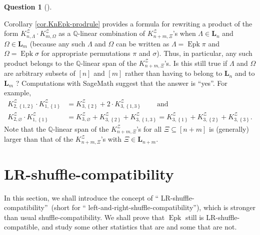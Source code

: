 \documentclass[numbers=enddot,12pt,final,onecolumn,notitlepage]{scrartcl}%
\theoremstyle{definition}
\newtheorem{quest}[theo]{Question}
\newenvironment{question}[1][]
{\begin{quest}[#1]\begin{leftbar}}
{\end{leftbar}\end{quest}}
\newenvironment{question}[1][Question]{\noindent\textbf{#1.} }{\ \rule{0.5em}{0.5em}}
\begin{document}
\begin{question}
Corollary \ref{cor.KnEpk-prodrule} provides a formula for rewriting a product
of the form $K_{n,\Lambda}^{\mathcal{Z}}\cdot K_{m,\Omega}^{\mathcal{Z}}$ as a
$\mathbb{Q}$-linear combination of $K_{n+m,\Xi}^{\mathcal{Z}}$'s when
$\Lambda\in\mathbf{L}_{n}$ and $\Omega\in\mathbf{L}_{m}$ (because any such
$\Lambda$ and $\Omega$ can be written as $\Lambda=\operatorname{Epk}\pi$ and
$\Omega=\operatorname{Epk}\sigma$ for appropriate permutations $\pi$ and
$\sigma$). Thus, in particular, any such product belongs to the $\mathbb{Q}%
$-linear span of the $K_{n+m,\Xi}^{\mathcal{Z}}$'s. Is this still true if
$\Lambda$ and $\Omega$ are arbitrary subsets of $\left[  n\right]  $ and
$\left[  m\right]  $ rather than having to belong to $\mathbf{L}_{n}$ and to
$\mathbf{L}_{m}$ ? Computations with SageMath suggest that the answer is
\textquotedblleft yes\textquotedblright. For example,%
\begin{align*}
K_{2,\left\{  1,2\right\}  }^{\mathcal{Z}}\cdot K_{1,\left\{  1\right\}
}^{\mathcal{Z}}  & =K_{3,\left\{  2\right\}  }^{\mathcal{Z}}+2\cdot
K_{3,\left\{  1,3\right\}  }^{\mathcal{Z}}\ \ \ \ \ \ \ \ \ \ \text{and}\\
K_{2,\varnothing}^{\mathcal{Z}}\cdot K_{1,\left\{  1\right\}  }^{\mathcal{Z}}
& =K_{3,\varnothing}^{\mathcal{Z}}+K_{3,\left\{  2\right\}  }^{\mathcal{Z}%
}+K_{3,\left\{  1,3\right\}  }^{\mathcal{Z}}=K_{3,\left\{  1\right\}
}^{\mathcal{Z}}+K_{3,\left\{  2\right\}  }^{\mathcal{Z}}+K_{3,\left\{
3\right\}  }^{\mathcal{Z}}.
\end{align*}
Note that the $\mathbb{Q}$-linear span of the $K_{n+m,\Xi}^{\mathcal{Z}}$'s
for all $\Xi\subseteq\left[  n+m\right]  $ is (generally) larger than that of
the $K_{n+m,\Xi}^{\mathcal{Z}}$'s with $\Xi\in\mathbf{L}_{n+m}$.
\end{question}


\section{\label{sect.LR}LR-shuffle-compatibility}

In this section, we shall introduce the concept of \textquotedblleft
LR-shuffle-compatibility\textquotedblright\ (short for \textquotedblleft
left-and-right-shuffle-compatibility\textquotedblright), which is stronger
than usual shuffle-compatibility. We shall prove that $\operatorname{Epk}$
still is LR-shuffle-compatible, and study some other statistics that are and
some that are not.
\end{document}

